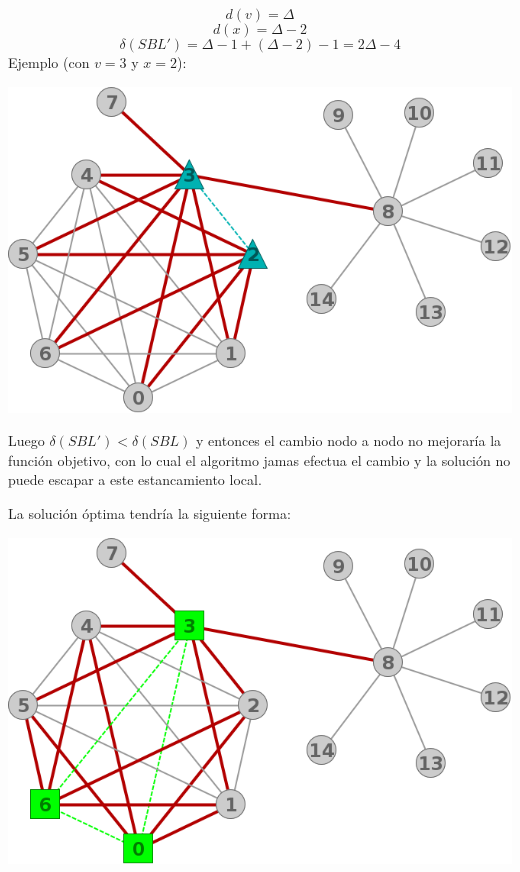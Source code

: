 \[ d(v) = \Delta \]
\[ d(x) = \Delta -2 \]
\[ \delta(SBL') = \Delta -1 + (\Delta -2) -1 = 2 \Delta -4 \]
Ejemplo (con $v=3$ y $x=2$):
\begin{center}
	\includegraphics[scale = 0.3]{img/ej3/busqueda_local/estrellaCMF_st12.png} \\
\end{center}

Luego $\delta(SBL') < \delta(SBL)$ y entonces el cambio nodo a nodo no 
mejorar\'ia la funci\'on objetivo, con lo cual el algoritmo jamas efectua
el cambio y la soluci\'on no puede escapar a este estancamiento local.

La soluci\'on \'optima tendr\'ia la siguiente forma:
\begin{center}
	\includegraphics[scale = 0.3]{img/ej3/busqueda_local/estrellaCMF_st22.png} \\
\end{center}
